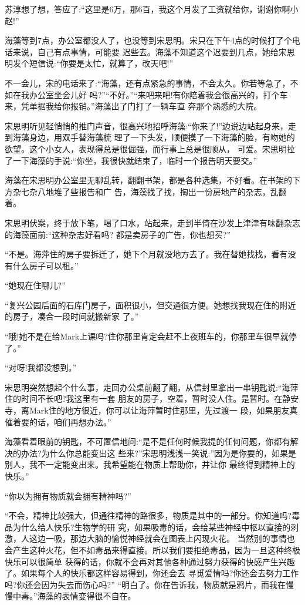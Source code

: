 \documentclass[11pt,a4paper,onecolumn]{article}
\begin{document}
苏淳想了想，答应了:``这里是6万，那6百，我这个月发了工资就给你，谢谢你啊小赵!''

海藻等到7点，办公室都没人了，也没等到宋思明。宋只在下午4点的时候打了个电话来说，自己有点事情，可能要
迟些去。海藻不知道这个迟要到几点，她给宋思明发个短信说:``你要是太忙，就算了，改天吧!''

不一会儿，宋的电话来了:``海藻，还有点紧急的事情，不会太久。你若等急了，不如在我办公室坐会儿好
吗?''``不好。''``来吧来吧!有你陪着我会很高兴的，打个车来，凭单据我给你报销。''海藻出了门打了一辆车直
奔那个熟悉的大院。

宋思明听见轻悄悄的推门声音，很高兴地招呼海藻:``你来了!''边说边站起身来，走到海藻身边，用双手替海藻梳
理了一下头发，顺便摸了一下海藻的脸，有吻她的欲望。这个小女人，表现得总是很倔强，而行事上总是很顺从，
可爱。宋思明拉了一下海藻的手说:``你坐，我很快就结束了，临时一个报告明天要交。''

海藻在宋思明办公室里无聊乱转，翻翻书架，都是各种选集，不好看。在书架的下方杂七杂八地堆了些报告和广
告，海藻找了找，掏出一份房地产的杂志，乱翻着。

宋思明伏案，终于放下笔，喝了口水，站起来，走到半倚在沙发上津津有味翻杂志的海藻面前:``这种杂志好看吗?
都是卖房子的广告，你也想买?''

``不是。海萍住的房子要拆迁了，她下个月就没地方去了。我在替她找找，看有没有什么房子可以租。''

``她现在住哪儿?''

``复兴公园后面的石库门房子，面积很小，但交通很方便。她想找我现在住的附近的房子，凑合一段时间就搬新家
了。''

``哦!她不是在给Mark上课吗?住你那里肯定会赶不上夜班车的，你那里车很早就停了。''

``对呀!我都没想到。''

宋思明突然想起个什么事，走回办公桌前翻了翻，从信封里拿出一串钥匙说:``海萍住的时间不长吧?我这里有一套
朋友的房子，空着，暂时没人住。是暂时。在静安寺，离Mark住的地方很近，你可以让海萍暂时住那里，先过渡一
段，如果朋友真催着要的话，咱们再想办法。''

海藻看着眼前的钥匙，不可置信地问:``是不是任何时候我提的任何问题，你都有解决的办法?为什么你总能变出这
些来?''宋思明浅浅一笑说:''因为是你要的，如果是别人，我不一定能变出来。我希望能在物质上帮助你，并让你
最终得到精神上的快乐。''

``你以为拥有物质就会拥有精神吗?''

``不会，精神比较强大，但通往精神的路很多，物质是其中的一部分。你知道吗?毒品为什么给人快乐?生物学的研
究，如果吸毒的话，会给某些神经中枢以直接的刺激，人这边一吸，那边大脑的愉悦神经就会在图表上闪现火花。
当然别的事情也会产生这种火花，但不如毒品来得直接。所以我们要拒绝毒品，因为一旦这种终极快乐可以很简单
获得的话，你就不会再对其他各种通过努力获得的快感产生兴趣了。如果每个人的快乐都这样容易得到，你还会去
寻觅爱情吗?你还会去努力工作吗?你还会因为失去而伤心吗?'' ``明白了。你在告诉我，物质就是鸦片，而我在慢
慢中毒。''海藻的表情变得很不自在。
\end{document}
